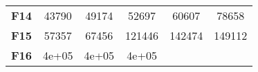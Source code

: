\documentclass[12pt,a4paper]{article}
\begin{document}
\begin{longtable}[c]{@{}cccccc@{}}
\begin{minipage}[t]{0.12\columnwidth}
\textbf{F14}
\strut\end{minipage} &
\begin{minipage}[t]{0.08\columnwidth}\centering\strut
43790
\strut\end{minipage} &
\begin{minipage}[t]{0.08\columnwidth}\centering\strut
49174
\strut\end{minipage} &
\begin{minipage}[t]{0.09\columnwidth}\centering\strut
52697
\strut\end{minipage} &
\begin{minipage}[t]{0.10\columnwidth}\centering\strut
60607
\strut\end{minipage} &
\begin{minipage}[t]{0.10\columnwidth}\centering\strut
78658
\strut\end{minipage}\tabularnewline
\begin{minipage}[t]{0.12\columnwidth}\centering\strut
\textbf{F15}
\strut\end{minipage} &
\begin{minipage}[t]{0.08\columnwidth}\centering\strut
57357
\strut\end{minipage} &
\begin{minipage}[t]{0.08\columnwidth}\centering\strut
67456
\strut\end{minipage} &
\begin{minipage}[t]{0.09\columnwidth}\centering\strut
121446
\strut\end{minipage} &
\begin{minipage}[t]{0.10\columnwidth}\centering\strut
142474
\strut\end{minipage} &
\begin{minipage}[t]{0.10\columnwidth}\centering\strut
149112
\strut\end{minipage}\tabularnewline
\begin{minipage}[t]{0.12\columnwidth}\centering\strut
\textbf{F16}
\strut\end{minipage} &
\begin{minipage}[t]{0.08\columnwidth}\centering\strut
4e+05
\strut\end{minipage} &
\begin{minipage}[t]{0.08\columnwidth}\centering\strut
4e+05
\strut\end{minipage} &
\begin{minipage}[t]{0.09\columnwidth}\centering\strut
4e+05
\strut\end{minipage} &
\begin{minipage}[t]{0.10\columnwidth}\centering\strut

\end{minipage}
\end{longtable}
\end{document}
